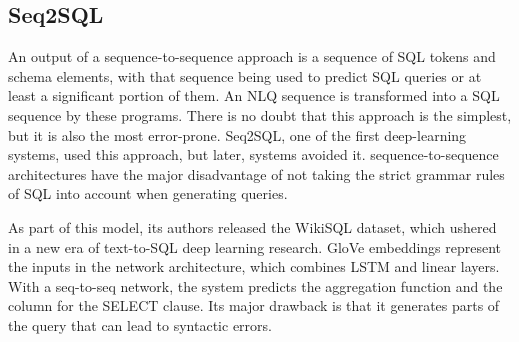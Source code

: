 \subsection{Seq2SQL}

An output of a sequence-to-sequence approach is a sequence of SQL tokens and schema elements, with that sequence being used to predict SQL queries or at least a significant portion of them. An NLQ sequence is transformed into a SQL sequence by these programs. There is no doubt that this approach is the simplest, but it is also the most error-prone. Seq2SQL\cite{zhong_seq2sql_2017}, one of the first deep-learning systems, used this approach, but later, systems avoided it. sequence-to-sequence architectures have the major disadvantage of not taking the strict grammar rules of SQL into account when generating queries.

As part of this model, its authors released the WikiSQL dataset, which ushered in a new era of text-to-SQL deep learning research. GloVe embeddings represent the inputs in the network architecture, which combines LSTM and linear layers. With a seq-to-seq network, the system predicts the aggregation function and the column for the SELECT clause. Its major drawback is that it generates parts of the query that can lead to syntactic errors.